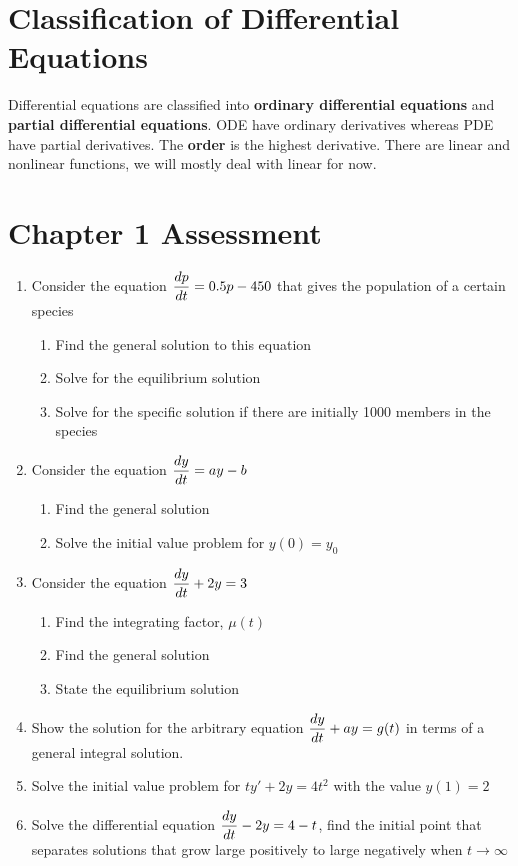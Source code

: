 \section{Classification of Differential Equations}
Differential equations are classified into \textbf{ordinary differential equations} and \textbf{partial differential equations}. ODE have ordinary derivatives whereas PDE have partial derivatives. The \textbf{order} is the highest derivative. There are linear and nonlinear functions, we will mostly deal with linear for now. 
\pagebreak
\section{Chapter 1 Assessment}
\begin{multicols*}{2}
	\begin{enumerate}
		\item Consider the equation $\dfrac{d p}{d t} = 0.5p -450$ that gives the population of a certain species
		\begin{enumerate}
			\item Find the general solution to this equation
			\item Solve for the equilibrium solution 
			\item Solve for the specific solution if there are initially 1000 members in the species
		\end{enumerate}
		\item Consider the equation $\dfrac{d y}{d t} = ay - b$
		\begin{enumerate}
			\item Find the general solution
			\item Solve the initial value problem for $y(0) = y_0$
		\end{enumerate}
		\item Consider the equation $\dfrac{d y}{d t} + 2y = 3$ 
		\begin{enumerate}
			\item Find the integrating factor, $\mu(t)$ 
			\item Find the general solution 
			\item State the equilibrium solution 
		\end{enumerate}
		\item Show the solution for the arbitrary equation $\dfrac{d y}{d t} + ay = g(t)$ in terms of a general integral solution. 
		\item Solve the initial value problem for $ty' + 2y = 4t^2$ with the value $y(1) = 2$ 
		\item Solve the differential equation $\dfrac{d y}{d t} - 2y = 4 -t$, find the initial point that separates solutions that grow large positively to large negatively when $t\rightarrow \infty $ 

\end{enumerate}
\end{multicols*}
